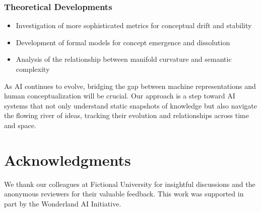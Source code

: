 \documentclass{article}
\begin{document}
\subsubsection{Theoretical Developments}
\begin{itemize}
    \item Investigation of more sophisticated metrics for conceptual drift and stability
    \item Development of formal models for concept emergence and dissolution
    \item Analysis of the relationship between manifold curvature and semantic complexity
\end{itemize}

As AI continues to evolve, bridging the gap between machine representations and human conceptualization will be crucial. Our approach is a step toward AI systems that not only understand static snapshots of knowledge but also navigate the flowing river of ideas, tracking their evolution and relationships across time and space.

\section*{Acknowledgments}
We thank our colleagues at Fictional University for insightful discussions and the anonymous reviewers for their valuable feedback. This work was supported in part by the Wonderland AI Initiative.
\end{document}
